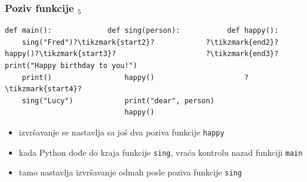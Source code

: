 \documentclass[compress]{beamer}
\begin{document}
\begin{frame}[fragile]
  \frametitle{Poziv funkcije $_5$}
\begin{verbatim}
def main():             def sing(person):           def happy():
    sing("Fred")?\tikzmark{start2}?            ?\tikzmark{end2}?happy()?\tikzmark{start3}?                     ?\tikzmark{end3}?print("Happy birthday to you!")
    print()                 happy()                     ?\tikzmark{start4}?
    sing("Lucy")            print("dear", person)
                            happy()
\end{verbatim}
\begin{itemize}
  \item izvršavanje se nastavlja sa još dva poziva funkcije \texttt{happy}
  \item kada Python dođe do kraja funkcije \texttt{sing}, vraća kontrolu nazad funkciji \texttt{main}
  \item tamo nastavlja izvršavanje odmah posle poziva funkcije \texttt{sing}
\end{itemize}
\end{frame}
\end{document}
